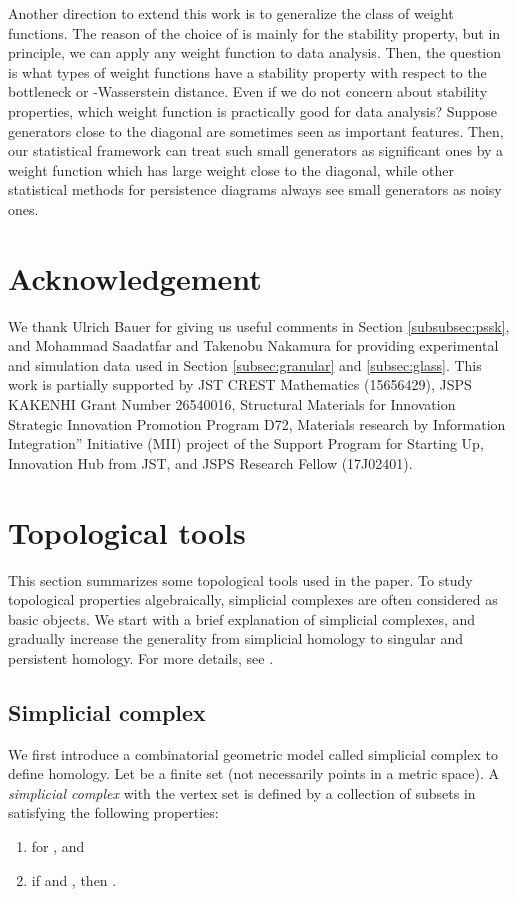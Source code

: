 \documentclass{article}
\begin{document}
Another direction to extend this work is to generalize the class of weight functions.
The reason of the choice of  is mainly for the stability property, but in principle, we can apply any weight function to data analysis.
Then, the question is what types of weight functions have a stability property with respect to the bottleneck or -Wasserstein distance.
Even if we do not concern about stability properties, which weight function is practically good for data analysis?
Suppose generators close to the diagonal are sometimes seen as important features.
Then, our statistical framework can treat such small generators as significant ones by a weight function which has large weight close to the diagonal, while other statistical methods for persistence diagrams always see small generators as noisy ones.



\section*{Acknowledgement}
We thank Ulrich Bauer for giving us useful comments in Section \ref{subsubsec:pssk}, and Mohammad Saadatfar and Takenobu Nakamura for providing experimental and simulation data used in Section \ref{subsec:granular} and \ref{subsec:glass}.
This work is partially supported by JST CREST Mathematics (15656429), JSPS KAKENHI Grant Number 26540016, Structural Materials for Innovation Strategic Innovation Promotion Program D72, Materials research by Information Integration” Initiative (MII) project of the Support Program for Starting Up, Innovation Hub from JST, and JSPS Research Fellow (17J02401).

\newpage

\appendix

\section{Topological tools}
\label{sec:topology}
This section summarizes some topological tools used in the paper.
To study topological properties algebraically, simplicial complexes are often considered as basic objects.
We start with a brief explanation of simplicial complexes, and gradually increase the generality from simplicial homology to singular and persistent homology.
For more details, see \cite{Ha02}.

\subsection{Simplicial complex}\label{sec:sc}
We first introduce a combinatorial geometric model called simplicial complex to define homology.
Let  be a finite set (not necessarily points in a metric space).
A {\em simplicial complex} with the vertex set  is defined by a collection  of subsets in  satisfying the following properties:
\begin{enumerate}
\item  for , and
\item if  and , then .
\end{enumerate}
\end{document}
